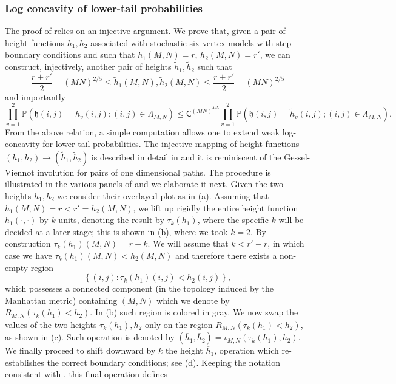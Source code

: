 \documentclass[reqno,11pt]{amsart}
\numberwithin{equation}{section}
\theoremstyle{definition}
\begin{document}
\subsubsection{Log concavity of lower-tail probabilities} \label{subs:convexity intro}
 The proof of  relies on an injective argument. We prove that, given a pair of height functions $h_1,h_2$ associated with stochastic six vertex models with step boundary conditions and such that $h_1(M,N)=r$, $h_2(M,N)=r'$, we can construct, injectively, another pair of heights $\widetilde{h}_1, \widetilde{h}_2$ such that
    \begin{equation} \label{eq:inequality htilde intro}
         \frac{r+r'}{2} - (MN)^{2/5} \le \widetilde{h}_1(M,N),  \widetilde{h}_2(M,N) \le  \frac{r+r'}{2} + (MN)^{2/5}
    \end{equation}
    and importantly
    \begin{equation}\label{eq:inequality weight intro}
        \prod_{v=1}^2 \mathbb{P}(\mathfrak{h}(i,j)=h_v(i,j); (i,j)\in \Lambda_{M,N}) \le \mathsf{C}^{(MN)^{4/5}} \prod_{v=1}^2 \mathbb{P}(\mathfrak{h}(i,j)= \widetilde{h}_v(i,j); (i,j)\in \Lambda_{M,N}).
    \end{equation}
From the above relation, a simple computation allows one to extend weak log-concavity for lower-tail probabilities.  The injective mapping of height functions $(h_1,h_2) \to (\widetilde{h}_1,\widetilde{h}_2)$ is described in detail in  and it is reminiscent of the Gessel-Viennot involution \cite{gessel1985binomial} for pairs of one dimensional paths. The procedure is illustrated in the various panels of  and we elaborate it next. Given the two heights $h_1,h_2$ we consider their overlayed plot as in (a). Assuming that $h_1(M,N)=r < r' =h_2(M,N)$, we lift up rigidly the entire height function $h_1(\cdot,\cdot)$ by $k$ units, denoting the result by $\tau_k(h_1)$, where the specific $k$ will be decided at a later stage; this is shown in (b), where we took $k=2$. By construction $\tau_k(h_1)(M,N)=r+k$. We will assume that $k < r'-r$, in which case we have $\tau_k(h_1)(M,N)<h_2(M,N)$ and therefore there exists a non-empty region
    \begin{equation*}
         \left\{ (i,j): \tau_k(h_1)(i,j) < h_2(i,j)\right\},
    \end{equation*}
    which possesses a connected component (in the topology induced by the Manhattan metric) containing $(M,N)$ which we denote by $R_{M,N}(\tau_k(h_1)<h_2)$. In (b) such region is colored in gray. We now swap the values of the two heights $\tau_k(h_1), h_2$ only on the region $R_{M,N}(\tau_k(h_1)<h_2)$, as shown in (c). Such operation is denoted by $(\overline{h}_1, \overline{h}_2)=\iota_{M,N}(\tau_k(h_1),h_2)$. We finally proceed to shift downward by $k$ the height $\overline{h}_1$, operation which re-establishes the correct boundary conditions; see (d). Keeping the notation consistent with , this final operation defines
\end{document}
